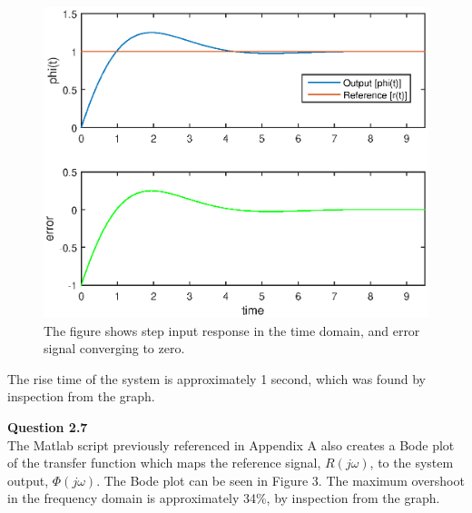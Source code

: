 \documentclass{article}
\begin{document}
	\begin{figure}[h]
		\centering
		\includegraphics[scale=0.8]{fig3.eps}
		\caption{The figure shows step input response in the time domain, and error signal converging to zero.}
	\end{figure}
	
	The rise time of the system is approximately 1 second, which was found by inspection from the graph.\\
	
	\newpage

	\textbf{Question 2.7}\\
	
	The Matlab script previously referenced in Appendix A also creates a Bode plot of the transfer function which maps the reference signal, $R(j \omega)$, to the system output, $\Phi(j \omega)$. The Bode plot can be seen in Figure 3. The maximum overshoot in the frequency domain is approximately 34\%, by inspection from the graph.
	
\end{document}

